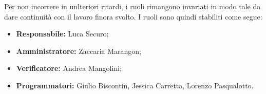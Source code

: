 \noindent Per non incorrere in unlteriori ritardi, i ruoli rimangono invariati in modo tale da dare continuità con il lavoro finora svolto. I ruoli sono quindi stabiliti come segue:
\begin{itemize}
    \item \textbf{Responsabile:} Luca Securo;
    \item \textbf{Amministratore:} Zaccaria Marangon;
    \item \textbf{Verificatore:} Andrea Mangolini;
    \item \textbf{Programmatori:} Giulio Biscontin, Jessica Carretta, Lorenzo Pasqualotto.
\end{itemize}